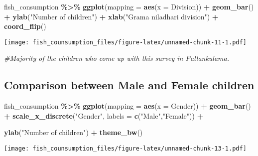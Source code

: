 \documentclass[
]{article}
\newenvironment{Shaded}{\begin{snugshade}}{\end{snugshade}}
\newcommand{\AttributeTok}[1]{\textcolor[rgb]{0.13,0.29,0.53}{#1}}
\newcommand{\CommentTok}[1]{\textcolor[rgb]{0.56,0.35,0.01}{\textit{#1}}}
\newcommand{\FunctionTok}[1]{\textcolor[rgb]{0.13,0.29,0.53}{\textbf{#1}}}
\newcommand{\NormalTok}[1]{#1}
\newcommand{\SpecialCharTok}[1]{\textcolor[rgb]{0.81,0.36,0.00}{\textbf{#1}}}
\newcommand{\StringTok}[1]{\textcolor[rgb]{0.31,0.60,0.02}{#1}}
\begin{document}
\begin{Shaded}
\begin{Highlighting}[]
\NormalTok{fish\_consumption }\SpecialCharTok{\%\textgreater{}\%}
\FunctionTok{ggplot}\NormalTok{(}\AttributeTok{mapping =} \FunctionTok{aes}\NormalTok{(}\AttributeTok{x =}\NormalTok{ Division)) }\SpecialCharTok{+}
\FunctionTok{geom\_bar}\NormalTok{() }\SpecialCharTok{+}
\FunctionTok{ylab}\NormalTok{(}\StringTok{"Number of children"}\NormalTok{) }\SpecialCharTok{+}
\FunctionTok{xlab}\NormalTok{(}\StringTok{"Grama niladhari division"}\NormalTok{) }\SpecialCharTok{+}
\FunctionTok{coord\_flip}\NormalTok{()}
\end{Highlighting}
\end{Shaded}

\texttt{[image: fish\_counsumption\_files/figure-latex/unnamed-chunk-11-1.pdf]}

\begin{Shaded}
\begin{Highlighting}[]
\CommentTok{\#Majority of the children who come up with this survey in Pallankulama. }
\end{Highlighting}
\end{Shaded}

\hypertarget{comparison-between-male-and-female-children}{%
\subsection{Comparison between Male and Female
children}\label{comparison-between-male-and-female-children}}

\begin{Shaded}
\begin{Highlighting}[]
\NormalTok{fish\_consumption }\SpecialCharTok{\%\textgreater{}\%}
\FunctionTok{ggplot}\NormalTok{(}\AttributeTok{mapping =} \FunctionTok{aes}\NormalTok{(}\AttributeTok{x =}\NormalTok{ Gender)) }\SpecialCharTok{+}
\FunctionTok{geom\_bar}\NormalTok{() }\SpecialCharTok{+}
\FunctionTok{scale\_x\_discrete}\NormalTok{(}\StringTok{"Gender"}\NormalTok{, }\AttributeTok{labels =} \FunctionTok{c}\NormalTok{(}\StringTok{"Male"}\NormalTok{,}\StringTok{"Female"}\NormalTok{)) }\SpecialCharTok{+}

\FunctionTok{ylab}\NormalTok{(}\StringTok{"Number of children"}\NormalTok{) }\SpecialCharTok{+}
\FunctionTok{theme\_bw}\NormalTok{()}
\end{Highlighting}
\end{Shaded}

\texttt{[image: fish\_counsumption\_files/figure-latex/unnamed-chunk-13-1.pdf]}
\end{document}
